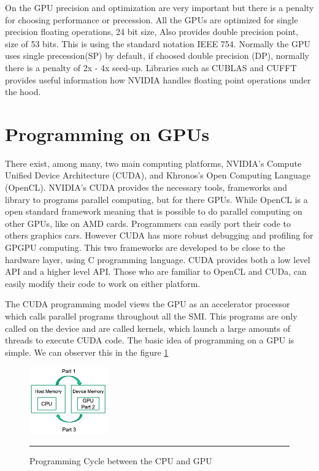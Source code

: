 On the GPU precision and optimization are very important but there is a penalty for choosing performance or precession. All the GPUs are optimized for single precision floating operations, 24 bit size, Also provides double precision point, size of  53 bits. This is using the standard notation IEEE 754. Normally the GPU uses single precession(SP) by default, if choosed double precision (DP), normally there is a penalty of  2x - 4x seed-up. \cite{precision}
Libraries such as CUBLAS and CUFFT provides useful information how NVIDIA handles floating point operations under the hood.


\section{Programming on GPUs}

There exist, among many, two main computing platforms, NVIDIA's Compute Unified Device Architecture (CUDA), and Khronos's Open Computing Language (OpenCL). NVIDIA's CUDA provides the necessary tools, frameworks and library to programs parallel computing, but for there GPUs. While OpenCL is a open standard framework meaning that is possible to do parallel computing on other GPUs, like on AMD cards. Programmers can easily port their code to others graphics cars.  However CUDA has more robust debugging and profiling for GPGPU computing. This two frameworks are developed to be close to the hardware layer, using C programming language. CUDA provides both a low level API and a higher level API. Those who are familiar to OpenCL and CUDa, can easily modify their code to work on either platform.\cite{hwu}


The CUDA programming model views the GPU as an accelerator processor which calls parallel programs  throughout all the SMI. This programs are only called on the device and are called kernels, which launch a large amounts of threads to execute CUDA code. The basic idea of programming on a GPU is simple. We can observer this in the figure \ref{fig:cycle}

\begin{figure}[htbp]
	\centering
		\includegraphics[width=0.3\textwidth]{Figures/cycle.png}
		\rule{35em}{0.5pt}
	\caption[Programming Cycle]{Programming Cycle between the CPU and GPU}
	\label{fig:cycle}
\end{figure}


